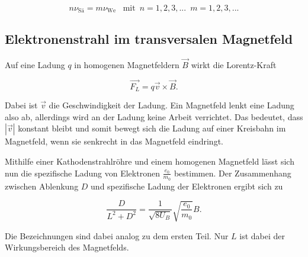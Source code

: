 \begin{equation}
  n \nu_\text{Sä} = m \nu_\text{We} \,\,\,\,\, \text{mit} \, \, \, n=1, 2, 3, ... \, \, \, m=1, 2, 3, ...
  \label{eq:2}
\end{equation}


\subsection{Elektronenstrahl im transversalen Magnetfeld}

Auf eine Ladung $q$ in homogenen Magnetfeldern $\vec{B}$ wirkt die Lorentz-Kraft

\begin{equation*}
  \vec{F_L} = q \vec{v} \times \vec{B}.
\end{equation*}

Dabei ist $\vec{v}$ die Geschwindigkeit der Ladung. Ein Magnetfeld lenkt eine Ladung
also ab, allerdings wird an der Ladung keine Arbeit verrichtet. Das bedeutet, dass
$|\vec{v}|$ konstant bleibt und somit bewegt sich die Ladung auf einer Kreisbahn im Magnetfeld,
wenn sie senkrecht in das Magnetfeld eindringt.

Mithilfe einer Kathodenstrahlröhre und einem homogenen Magnetfeld lässt sich nun die
spezifische Ladung von Elektronen $\frac{e_0}{m_0}$ bestimmen. Der Zusammenhang zwischen
Ablenkung $D$ und spezifische Ladung der Elektronen ergibt sich zu

\begin{equation}
  \frac{D}{L^2 + D^2} = \frac{1}{\sqrt{8 U_B}} \sqrt{\frac{e_0}{m_0}} B.
  \label{eq:3}
\end{equation}

Die Bezeichnungen sind dabei analog zu dem ersten Teil. Nur $L$ ist dabei der
Wirkungsbereich des Magnetfelds. 
